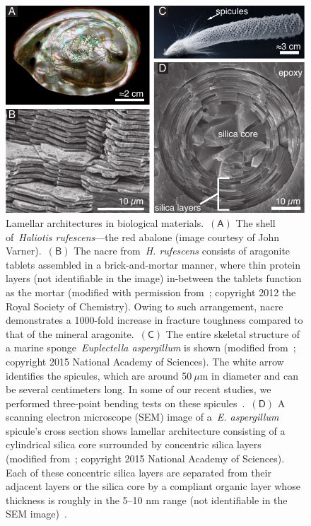 \documentclass[preprint,10pt,times]{elsarticle}
\numberwithin{equation}{section}
\newcommand{\pr}[1]{\left( #1 \right)}
\newcommand{\subf}[1]{\pr{\textsf{#1}}}
\begin{document}
\begin{figure}
\begin{centering}
\includegraphics[width=1\textwidth]{../Figures_Submit/Lamellar_V3.pdf}
\par\end{centering}
\caption{\label{fig:lamellar} Lamellar architectures in biological materials.~$\subf{A}$
The shell of~\textit{Haliotis rufescens}---the red abalone (image
courtesy of John Varner).~$\subf{B}$ The nacre from~\textit{H. rufescens}
consists of aragonite tablets assembled in a brick-and-mortar manner,
where thin protein layers (not identifiable in the image) in-between
the tablets function as the mortar (modified with permission from~\cite{rabiei2012nacre}; copyright 2012 the Royal Society of Chemistry). Owing to such arrangement,
nacre demonstrates a 1000-fold increase in fracture toughness compared
to that of the mineral aragonite.~$\subf{C}$ The entire skeletal
structure of a marine sponge~\textit{Euplectella aspergillum} is
shown (modified from~\cite{monn2015new}; copyright 2015 National Academy of Sciences). The white arrow identifies
the spicules, which are around 50$~\mu$m in diameter and can be several
centimeters long. In some of our recent studies, we performed three-point
bending tests on these spicules~\cite{monn2017enhanced,monn2020lamellar}.~$\subf{D}$
A scanning electron microscope (SEM) image of a~\textit{E. aspergillum}
spicule's cross section shows lamellar architecture consisting of
a cylindrical silica core surrounded by concentric silica layers (modified
from~\cite{monn2015new}; copyright 2015 National Academy of Sciences). Each of these concentric silica layers
are separated from their adjacent layers or the silica
core  by a compliant organic layer whose thickness
is roughly in the 5--10 nm range (not identifiable in the SEM image)~\cite{weaver2007hierarchical}.}
\end{figure}
\end{document}
